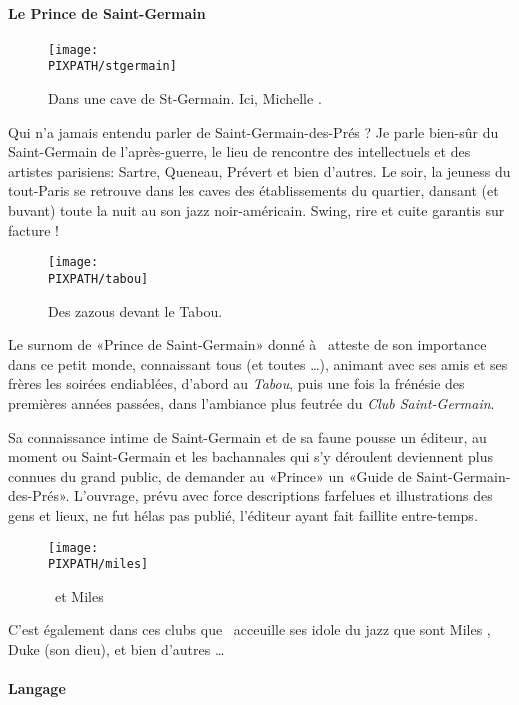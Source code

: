 \paragraph{Le Prince de Saint-Germain}

\begin{wrapfigure}{r}{.5\textwidth}
\centering
\texttt{[image: \\PIXPATH/stgermain]}
\caption{Dans une cave de St-Germain. Ici, Michelle .}
\end{wrapfigure}
Qui n'a jamais entendu parler de Saint-Germain-des-Prés ? Je parle bien-sûr
du Saint-Germain de l'après-guerre, le lieu de rencontre des intellectuels et
des artistes parisiens: Sartre, Queneau, Prévert %
et bien d'autres. Le soir, la jeuness du tout-Paris se retrouve dans les caves
des établissements du quartier, dansant (et buvant) toute la nuit au son jazz
noir-américain. Swing, rire et cuite garantis sur facture !


\begin{wrapfigure}{l}{.5\textwidth}
\centering
\texttt{[image: \\PIXPATH/tabou]}
\caption{Des zazous devant le Tabou.}
\end{wrapfigure}
Le surnom de «Prince de Saint-Germain» donné à \BV\ atteste de son importance
dans ce petit monde, connaissant tous (et toutes \ldots), animant avec ses amis et
ses frères les soirées endiablées, d'abord au \emph{Tabou}, puis une fois la
frénésie des premières années passées, dans l'ambiance plus feutrée du \emph{Club
Saint-Germain}.

Sa connaissance intime de Saint-Germain et de sa faune pousse un éditeur, au moment
ou Saint-Germain et les bachannales qui s'y déroulent deviennent plus connues du
grand public, de demander au «Prince» un «Guide de Saint-Germain-des-Prés».
L'ouvrage, prévu avec force descriptions farfelues et illustrations des gens et
lieux, ne fut hélas pas publié, l'éditeur ayant fait faillite entre-temps.

\begin{figure}
\centering
\texttt{[image: \\PIXPATH/miles]}
\caption{\BV\ et Miles }
\end{figure}
C'est également dans ces clubs que \BV\ acceuille ses idole du jazz que sont
Miles , Duke  (son dieu), et bien d'autres \ldots

\paragraph{Langage}

